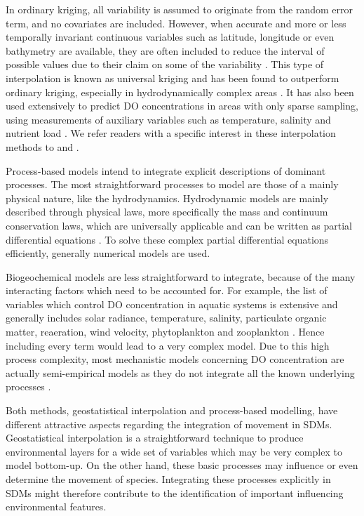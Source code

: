 \documentclass[12pt,authoryear]{elsarticle}
\begin{document}
In ordinary kriging, all variability is assumed to originate from the random error term, and no covariates are included. However, when accurate and more or less temporally invariant continuous variables such as latitude, longitude or even bathymetry are available, they are often included to reduce the interval of possible values due to their claim on some of the variability \citep{Urquhart2013,Verfaillie2006,Chehata2007}. This type of interpolation is known as universal kriging and has been found to outperform ordinary kriging, especially in hydrodynamically complex areas \citep{Urquhart2013}. It has also been used extensively to predict DO concentrations in areas with only sparse sampling, using measurements of auxiliary variables such as temperature, salinity and nutrient load \citep{Murphy2013,Zhou2013,Obenour2012,Barabas2001}. We refer readers with a specific interest in these interpolation methods to \citet{Calder2009} and \citet{Webster2008}.

\vspace{5mm}

Process-based models intend to integrate explicit descriptions of dominant processes. The most straightforward processes to model are those of a mainly physical nature, like the hydrodynamics. Hydrodynamic models are mainly described through physical laws, more specifically the mass and continuum conservation laws, which are universally applicable and can be written as partial differential equations \citep{Villars2001}. To solve these complex partial differential equations efficiently, generally numerical models are used. 

Biogeochemical models are less straightforward to integrate, because of the many interacting factors which need to be accounted for. For example, the list of variables which control DO concentration in aquatic systems is extensive and generally includes solar radiance, temperature, salinity, particulate organic matter, reaeration, wind velocity, phytoplankton and zooplankton \citep{Mandal2012}. Hence including every term would lead to a very complex model. Due to this high process complexity, most mechanistic models concerning DO concentration are actually semi-empirical models as they do not integrate all the known underlying processes \citep{Streeter1925}.

\vspace{5 mm}

Both methods, geostatistical interpolation and process-based modelling, have different attractive aspects regarding the integration of movement in SDMs. Geostatistical interpolation is a straightforward technique to produce environmental layers for a wide set of variables which may be very complex to model bottom-up. On the other hand, these basic processes may influence or even determine the movement of species. Integrating these processes explicitly in SDMs might therefore contribute to the identification of important influencing environmental features. 
\end{document}
